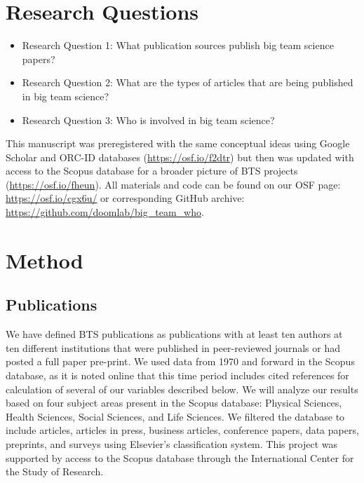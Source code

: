 \documentclass[
  man,floatsintext]{apa6}
\providecommand{\tightlist}{%
  \setlength{\itemsep}{0pt}\setlength{\parskip}{0pt}}
\begin{document}
\hypertarget{research-questions}{%
\section{Research Questions}\label{research-questions}}

\begin{itemize}
\tightlist
\item
  Research Question 1: What publication sources publish big team
  science papers?
\item
  Research Question 2: What are the types of articles that are being
  published in big team science?
\item
  Research Question 3: Who is involved in big team science?
\end{itemize}

This manuscript was preregistered with the same conceptual ideas using Google Scholar and ORC-ID databases (\url{https://osf.io/f2dtr}) but then was updated with access to the Scopus database for a broader picture of BTS projects (\url{https://osf.io/fheun}). All materials and code can be found on our OSF page: \url{https://osf.io/cgx6u/} or corresponding GitHub archive: \url{https://github.com/doomlab/big_team_who}.

\hypertarget{method}{%
\section{Method}\label{method}}

\hypertarget{publications}{%
\subsection{Publications}\label{publications}}

We have defined BTS publications as publications with at least ten
authors at ten different institutions that were published in
peer-reviewed journals or had posted a full paper pre-print. We used
data from 1970 and forward in the Scopus database, as it
is noted online that this time period includes cited references for
calculation of several of our variables described below. We will analyze
our results based on four subject areas present in the Scopus database: Physical Sciences,
Health Sciences, Social Sciences, and Life Sciences. We filtered the
database to include articles, articles in press, business articles,
conference papers, data papers, preprints, and surveys using Elsevier's
classification system. This project was supported by access to the Scopus database through the International Center for the Study of Research.
\end{document}
